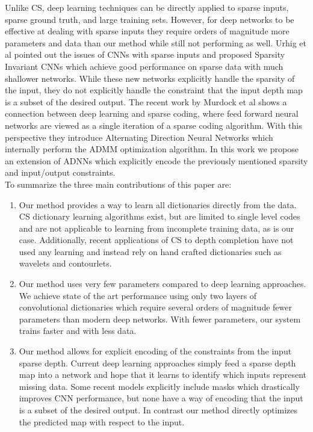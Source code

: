   Unlike CS, deep learning techniques can be directly applied to sparse inputs, sparse ground truth, and large training sets. However, for deep networks to be effective at dealing with sparse inputs they require orders of magnitude more parameters and data than our method while still not performing as well. Urhig et al pointed out the issues of CNNs with sparse inputs and proposed Sparsity Invariant CNNs which achieve good performance on sparse data with much shallower networks. While these new networks explicitly handle the sparsity of the input, they do not explicitly handle the constraint that the input depth map is a subset of the desired output. The recent work by Murdock et al shows a connection between deep learning and sparse coding, where feed forward neural networks are viewed as a single iteration of a sparse coding algorithm. With this perspective they introduce Alternating Direction Neural Networks which internally perform the ADMM optimization algorithm. In this work we propose an extension of ADNNs which explicitly encode the previously mentioned sparsity and input/output constraints.\\
  To summarize the three main contributions of this paper are:
  \begin{enumerate}
    \item Our method provides a way to learn all dictionaries directly from the data. CS dictionary learning algorithms exist, but are limited to single level codes and are not applicable to learning from incomplete training data, as is our case. Additionally, recent applications of CS to depth completion have not used any learning and instead rely on hand crafted dictionaries such as wavelets and contourlets.
  \item Our method uses very few parameters compared to deep learning approaches. We achieve state of the art performance using only two layers of convolutional dictionaries which require several orders of magnitude fewer parameters than modern deep networks. With fewer parameters, our system trains faster and with less data.
  \item Our method allows for explicit encoding of the constraints from the input sparse depth. Current deep learning approaches simply feed a sparse depth map into a network and hope that it learns to identify which inputs represent missing data. Some recent models explicitly include masks which drastically improves CNN performance, but none have a way of encoding that the input is a subset of the desired output. In contrast our method directly optimizes the predicted map with respect to the input.
  \end{enumerate}
  